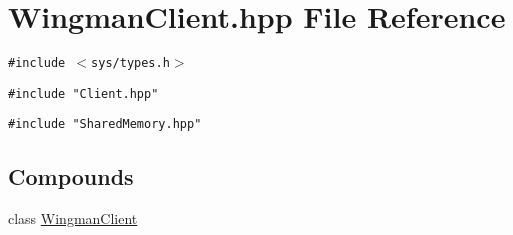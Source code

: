 \hypertarget{WingmanClient_hpp}{
\section{Wingman\-Client.hpp File Reference}
\label{WingmanClient_hpp}
}
{\tt \#include $<$sys/types.h$>$}\par
{\tt \#include "Client.hpp"}\par
{\tt \#include "Shared\-Memory.hpp"}\par
\subsection*{Compounds}
\begin{CompactItemize}
\item 
class \hyperlink{class_WingmanClient}{Wingman\-Client}
\end{CompactItemize}
